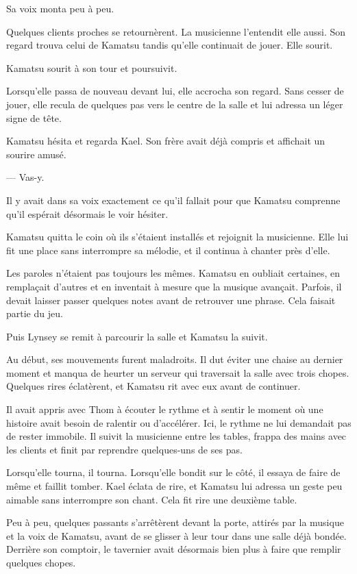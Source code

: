 Sa voix monta peu à peu.

Quelques clients proches se retournèrent. La musicienne l'entendit elle aussi.
Son regard trouva celui de Kamatsu tandis qu'elle continuait de jouer. Elle
sourit.

Kamatsu sourit à son tour et poursuivit.

Lorsqu'elle passa de nouveau devant lui, elle accrocha son regard. Sans cesser
de jouer, elle recula de quelques pas vers le centre de la salle et lui
adressa un léger signe de tête.

Kamatsu hésita et regarda Kael. Son frère avait déjà compris et affichait un
sourire amusé.

— Vas-y.

Il y avait dans sa voix exactement ce qu'il fallait pour que Kamatsu comprenne
qu'il espérait désormais le voir hésiter.

Kamatsu quitta le coin où ils s'étaient installés et rejoignit la musicienne.
Elle lui fit une place sans interrompre sa mélodie, et il continua à chanter
près d'elle.

Les paroles n'étaient pas toujours les mêmes. Kamatsu en oubliait certaines,
en remplaçait d'autres et en inventait à mesure que la musique avançait.
Parfois, il devait laisser passer quelques notes avant de retrouver une phrase.
Cela faisait partie du jeu.

Puis Lynsey se remit à parcourir la salle et Kamatsu la suivit.

Au début, ses mouvements furent maladroits. Il dut éviter une chaise au
dernier moment et manqua de heurter un serveur qui traversait la salle avec
trois chopes. Quelques rires éclatèrent, et Kamatsu rit avec eux avant de
continuer.

Il avait appris avec Thom à écouter le rythme et à sentir le moment où une
histoire avait besoin de ralentir ou d'accélérer. Ici, le rythme ne lui
demandait pas de rester immobile. Il suivit la musicienne entre les tables,
frappa des mains avec les clients et finit par reprendre quelques-uns de ses
pas.

Lorsqu'elle tourna, il tourna. Lorsqu'elle bondit sur le côté, il essaya de
faire de même et faillit tomber. Kael éclata de rire, et Kamatsu lui adressa
un geste peu aimable sans interrompre son chant. Cela fit rire une deuxième
table.

Peu à peu, quelques passants s'arrêtèrent devant la porte, attirés par la
musique et la voix de Kamatsu, avant de se glisser à leur tour dans une salle
déjà bondée. Derrière son comptoir, le tavernier avait désormais bien plus à
faire que remplir quelques chopes.

